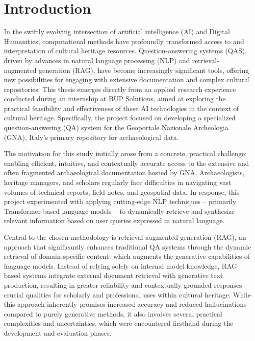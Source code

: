 \chapter{Introduction}
\label{chap:introduction}
\begin{spacing}{1.5}  %
In the swiftly evolving intersection of artificial intelligence (AI) and Digital Humanities, computational methods have profoundly transformed access to and interpretation of cultural heritage resources. Question-answering systems (QAS), driven by advances in natural language processing (NLP) and retrieval-augmented generation (RAG), have become increasingly significant tools, offering new possibilities for engaging with extensive documentation and complex cultural repositories. This thesis emerges directly from an applied research experience conducted during an internship at \href{https://www.bupsolutions.com/en/home_en/}{BUP Solutions}\nocite{bup_solutions_bup_nodate}, aimed at exploring the practical feasibility and effectiveness of these AI technologies in the context of cultural heritage. Specifically, the project focused on developing a specialized question-answering (QA) system for the Geoportale Nazionale Archeologia (GNA), Italy’s primary repository for archaeological data.

The motivation for this study initially arose from a concrete, practical challenge: enabling efficient, intuitive, and contextually accurate access to the extensive and often fragmented archaeological documentation hosted by GNA. Archaeologists, heritage managers, and scholars regularly face difficulties in navigating vast volumes of technical reports, field notes, and geospatial data. In response, this project experimented with applying cutting-edge NLP techniques -- primarily Transformer-based language models -- to dynamically retrieve and synthesize relevant information based on user queries expressed in natural language.

Central to the chosen methodology is retrieval-augmented generation (RAG), an approach that significantly enhances traditional QA systems through the dynamic retrieval of domain-specific content, which augments the generative capabilities of language models. Instead of relying solely on internal model knowledge, RAG-based systems integrate external document retrieval with generative text production, resulting in greater reliability and contextually grounded responses -- crucial qualities for scholarly and professional uses within cultural heritage. While this approach inherently promises increased accuracy and reduced hallucinations compared to purely generative methods, it also involves several practical complexities and uncertainties, which were encountered firsthand during the development and evaluation phases.


\end{spacing}
